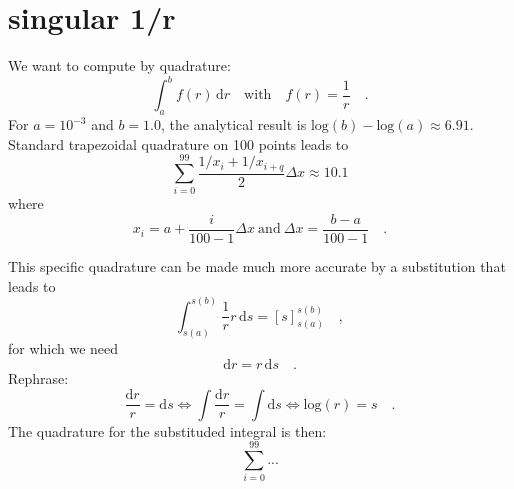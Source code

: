 \documentclass[a4paper,10pt]{article}
\begin{document}
\section{singular 1/r}
We want to compute by quadrature:
\begin{equation}
  \int_a^b f(r) \,\mathrm{d}r \quad \mathrm{with} \quad f(r) = \frac{1}{r} \quad .
\end{equation}
For $a=10^{-3}$ and $b=1.0$, the analytical result is $\mathrm{log}(b)-\mathrm{log}(a) \approx 6.91$.
Standard trapezoidal quadrature on 100 points leads to
\begin{equation}
  \sum_{i=0}^{99} \frac{1/x_i + 1/x_{i+q}}{2} \Delta x \approx 10.1
\end{equation}
where
\begin{equation}
  x_i = a+\frac{i}{100-1}\Delta x ~ \mathrm{and} ~ \Delta x = \frac{b-a}{100-1} \quad .
\end{equation}


This specific quadrature can be made much more accurate by a substitution that leads to 
\begin{equation}
  \int_{s(a)}^{s(b)} \frac{1}{r} r\,\mathrm{d}s = \left[ s \right]_{s(a)}^{s(b)} \quad ,
\end{equation}
for which we need
\begin{equation}
  \mathrm{d}r = r \, \mathrm{d}s \quad .
\end{equation}
Rephrase:
\begin{equation}
  \frac{\mathrm{d}r}{r} = \mathrm{d}s \Leftrightarrow \int \frac{\mathrm{d}r}{r} = \int \mathrm{d}s \Leftrightarrow
  \mathrm{log}(r) = s \quad .
\end{equation}
The quadrature for the substituded integral is then:
\begin{equation}
  \sum_{i=0}^{99} ...
\end{equation}
\end{document}
